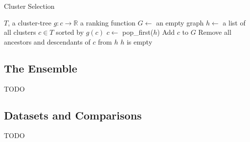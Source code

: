 \begin{algorithm}[h]
    \caption{Cluster Selection}
    \label{alg:cluster-selection}
\begin{algorithmic}[1]
    \REQUIRE $T$, a cluster-tree
    \REQUIRE $g : c \rightarrow \mathbb{R}$ a ranking function
    \STATE $G \gets$ an empty graph
    \STATE $h \gets$ a list of all clusters $c \in T$ sorted by $g(c)$
    \REPEAT
        \STATE $c \gets$ pop\_first($h$)
        \STATE Add $c$ to $G$
        \STATE Remove all ancestors and descendants of $c$ from $h$
    \UNTIL $h$ is empty
\end{algorithmic}
\end{algorithm}


\subsection{The Ensemble}
\label{subsec:methods:the-ensemble}
TODO


\subsection{Datasets and Comparisons}
\label{subsec:methods:datasets-and-comparisons}
TODO




